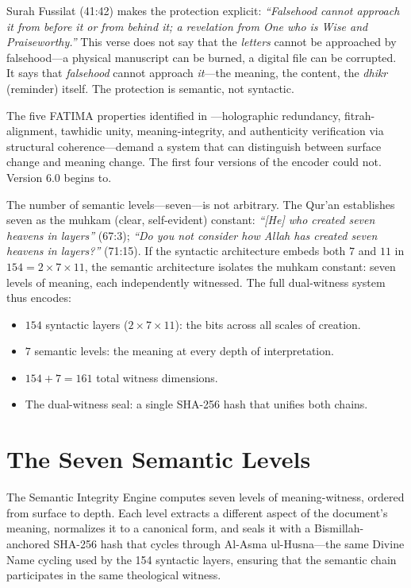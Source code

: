 \documentclass[11pt,a4paper]{article}
\begin{document}
Surah Fussilat (41:42) makes the protection explicit: \textit{``Falsehood cannot approach it from before it or from behind it; a revelation from One who is Wise and Praiseworthy.''} This verse does not say that the \textit{letters} cannot be approached by falsehood---a physical manuscript can be burned, a digital file can be corrupted. It says that \textit{falsehood} cannot approach \textit{it}---the meaning, the content, the \textit{dhikr} (reminder) itself. The protection is semantic, not syntactic.

The five FATIMA properties identified in \cite{arfeen2026fatima}---holographic redundancy, fitrah-alignment, tawhidic unity, meaning-integrity, and authenticity verification via structural coherence---demand a system that can distinguish between surface change and meaning change. The first four versions of the encoder could not. Version 6.0 begins to.

The number of semantic levels---seven---is not arbitrary. The Qur'an establishes seven as the muhkam (clear, self-evident) constant: \textit{``[He] who created seven heavens in layers''} (67:3); \textit{``Do you not consider how Allah has created seven heavens in layers?''} (71:15). If the syntactic architecture embeds both $7$ and $11$ in $154 = 2 \times 7 \times 11$, the semantic architecture isolates the muhkam constant: seven levels of meaning, each independently witnessed. The full dual-witness system thus encodes:

\begin{itemize}[nosep]
    \item $154$ syntactic layers ($2 \times 7 \times 11$): the bits across all scales of creation.
    \item $7$ semantic levels: the meaning at every depth of interpretation.
    \item $154 + 7 = 161$ total witness dimensions.
    \item The dual-witness seal: a single SHA-256 hash that unifies both chains.
\end{itemize}


\section{The Seven Semantic Levels}

The Semantic Integrity Engine computes seven levels of meaning-witness, ordered from surface to depth. Each level extracts a different aspect of the document's meaning, normalizes it to a canonical form, and seals it with a Bismillah-anchored SHA-256 hash that cycles through Al-Asma ul-Husna---the same Divine Name cycling used by the 154 syntactic layers, ensuring that the semantic chain participates in the same theological witness.
\end{document}
